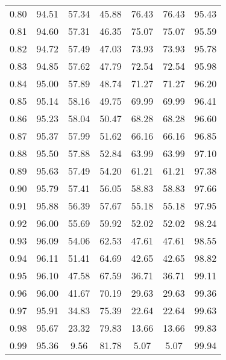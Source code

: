 \begin{tabular}{|c|c|c|c|c|c|c|}
      0.80 &     94.51 &     57.34 &      45.88 &   76.43 &      76.43 &         95.43 \\
      0.81 &     94.60 &     57.31 &      46.35 &   75.07 &      75.07 &         95.59 \\
      0.82 &     94.72 &     57.49 &      47.03 &   73.93 &      73.93 &         95.78 \\
      0.83 &     94.85 &     57.62 &      47.79 &   72.54 &      72.54 &         95.98 \\
      0.84 &     95.00 &     57.89 &      48.74 &   71.27 &      71.27 &         96.20 \\
      0.85 &     95.14 &     58.16 &      49.75 &   69.99 &      69.99 &         96.41 \\
      0.86 &     95.23 &     58.04 &      50.47 &   68.28 &      68.28 &         96.60 \\
      0.87 &     95.37 &     57.99 &      51.62 &   66.16 &      66.16 &         96.85 \\
      0.88 &     95.50 &     57.88 &      52.84 &   63.99 &      63.99 &         97.10 \\
      0.89 &     95.63 &     57.49 &      54.20 &   61.21 &      61.21 &         97.38 \\
      0.90 &     95.79 &     57.41 &      56.05 &   58.83 &      58.83 &         97.66 \\
      0.91 &     95.88 &     56.39 &      57.67 &   55.18 &      55.18 &         97.95 \\
      0.92 &     96.00 &     55.69 &      59.92 &   52.02 &      52.02 &         98.24 \\
      0.93 &     96.09 &     54.06 &      62.53 &   47.61 &      47.61 &         98.55 \\
      0.94 &     96.11 &     51.41 &      64.69 &   42.65 &      42.65 &         98.82 \\
      0.95 &     96.10 &     47.58 &      67.59 &   36.71 &      36.71 &         99.11 \\
      0.96 &     96.00 &     41.67 &      70.19 &   29.63 &      29.63 &         99.36 \\
      0.97 &     95.91 &     34.83 &      75.39 &   22.64 &      22.64 &         99.63 \\
      0.98 &     95.67 &     23.32 &      79.83 &   13.66 &      13.66 &         99.83 \\
      0.99 &     95.36 &      9.56 &      81.78 &    5.07 &       5.07 &         99.94 \\
\bottomrule
\end{tabular}
